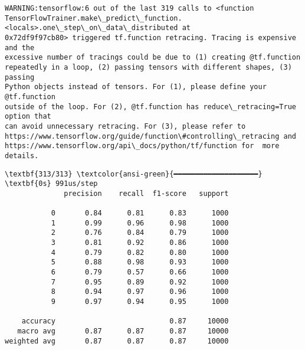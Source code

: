 \documentclass[12pt letter]{report}
\begin{document}
    \begin{Verbatim}[commandchars=\\\{\}]
WARNING:tensorflow:6 out of the last 319 calls to <function
TensorFlowTrainer.make\_predict\_function.<locals>.one\_step\_on\_data\_distributed at
0x72df9f97cb80> triggered tf.function retracing. Tracing is expensive and the
excessive number of tracings could be due to (1) creating @tf.function
repeatedly in a loop, (2) passing tensors with different shapes, (3) passing
Python objects instead of tensors. For (1), please define your @tf.function
outside of the loop. For (2), @tf.function has reduce\_retracing=True option that
can avoid unnecessary retracing. For (3), please refer to
https://www.tensorflow.org/guide/function\#controlling\_retracing and
https://www.tensorflow.org/api\_docs/python/tf/function for  more details.
    \end{Verbatim}

    \begin{Verbatim}[commandchars=\\\{\}]
\textbf{313/313} \textcolor{ansi-green}{━━━━━━━━━━━━━━━━━━━━} \textbf{0s} 991us/step
              precision    recall  f1-score   support

           0       0.84      0.81      0.83      1000
           1       0.99      0.96      0.98      1000
           2       0.76      0.84      0.79      1000
           3       0.81      0.92      0.86      1000
           4       0.79      0.82      0.80      1000
           5       0.88      0.98      0.93      1000
           6       0.79      0.57      0.66      1000
           7       0.95      0.89      0.92      1000
           8       0.94      0.97      0.96      1000
           9       0.97      0.94      0.95      1000

    accuracy                           0.87     10000
   macro avg       0.87      0.87      0.87     10000
weighted avg       0.87      0.87      0.87     10000

    \end{Verbatim}

    \begin{center}
    \end{center}
    { \hspace*{\fill} \\}
    
\end{document}

